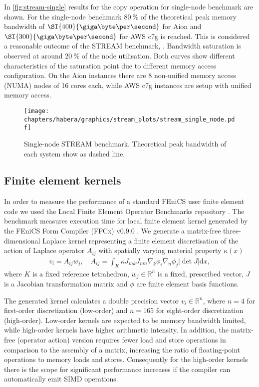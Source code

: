In \autoref{fig:stream-single} results for the copy operation for single-node
benchmark are shown. For the single-node benchmark $\SI{80}{\percent}$ of the
theoretical peak memory bandwidth of $\SI{400}{\giga\byte\per\second}$ for Aion
and $\SI{300}{\giga\byte\per\second}$ for AWS c7g is reached. This is considered
a reasonable outcome of the STREAM benchmark, \citep{McCalpin2023}. Bandwidth
saturation is observed at around $\SI{20}{\percent}$ of the node utilisation.
Both curves show different characteristics of the saturation point due to
different memory access configuration. On the Aion instances there are 8
non-unified memory access (NUMA) nodes of 16 cores each, while AWS c7g instances
are setup with unified memory access.

\begin{figure}
\begin{center}
        \texttt{[image: chapters/habera/graphics/stream\_plots/stream\_single\_node.pdf]}
\end{center}
	\caption{Single-node STREAM benchmark. Theoretical peak bandwidth of each system show as dashed line.}
        \label{fig:stream-single}
\end{figure}

\subsection*{Finite element kernels}

In order to measure the performance of a standard FEniCS user finite element
code we used the Local Finite Element Operator Benchmarks repository
\citep{Baratta2023}. The benchmark measures execution time for local finite
element kernel generated by the FEniCS Form Compiler (FFCx) v0.9.0
\citep{kirby_compiler_2006}. We generate a matrix-free three-dimensional
Laplace kernel representing a finite element discretisation of the action of
Laplace operator $A_{ij}$ with spatially varying material property $\kappa(x)$
\begin{align}
    v_i = A_{ij} w_j, \quad
    A_{ij} = \int_K \kappa J_{mk} J_{mn} \nabla_k \phi_i \nabla_n \phi_j |\det J| \mathrm dx,
\end{align}
where $K$ is a fixed reference tetrahedron, $w_j \in \mathbb{R}^{n}$ is a
fixed, prescribed vector, $J$ is a Jacobian transformation matrix and $\phi$
are finite element basis functions.

The generated kernel calculates a double precision vector $v_i \in
\mathbb{R}^{n}$, where $n = 4$ for first-order discretization (low-order) and
$n = 165$ for eight-order discretization (high-order). Low-order kernels are
expected to be memory bandwidth limited, while high-order kernels have higher
arithmetic intensity. In addition, the matrix-free (operator action) version
requires fewer load and store operations in comparison to the assembly of a
matrix, increasing the ratio of floating-point operations to memory loads and
stores. Consequently for the high-order kernels there is the scope for
significant performance increases if the compiler can automatically emit SIMD
operations.

